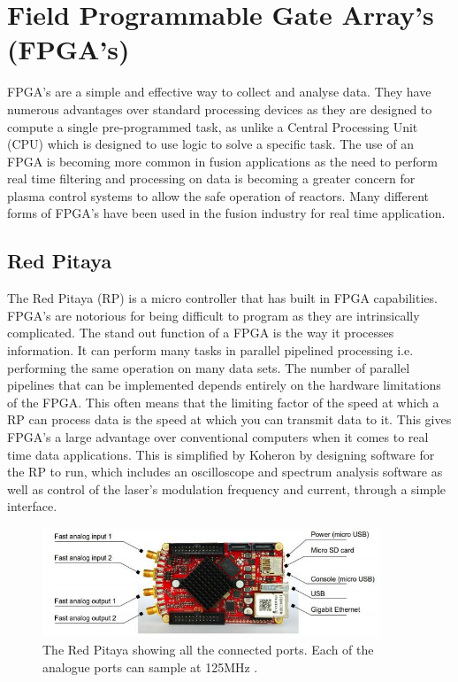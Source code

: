 \documentclass[12pt,a4paper,oneside]{report}
\begin{document}
	\section{Field Programmable Gate Array's (FPGA's)}
FPGA's are a simple and effective way to collect and analyse data. They have numerous advantages over standard processing devices as they are designed to compute a single pre-programmed task, as unlike a Central Processing Unit (CPU) which is designed to use logic to solve a specific task. The use of an FPGA is becoming more common in fusion applications as the need to perform real time filtering \cite{Naylor2010AnMAST} and processing on data is becoming a greater concern for plasma control systems to allow the safe operation of reactors. Many different forms of FPGA's have been used in the fusion industry for real time application.
	\subsection{Red Pitaya}
    
The Red Pitaya (RP) \cite{Leban2014RedManual} is a micro controller that has built in FPGA capabilities. FPGA's are notorious for being difficult to program as they are intrinsically complicated. The stand out function of a FPGA is the way it processes information. It can perform many tasks in parallel pipelined processing i.e. performing the same operation on many data sets. The number of parallel pipelines that can be implemented depends entirely on the hardware limitations of the FPGA. This often means that the limiting factor of the speed at which a RP can process data is the speed at which you can transmit data to it. This gives FPGA's a large advantage over conventional computers when it comes to real time data applications. This is simplified by Koheron by designing software for the RP to run, which includes an oscilloscope and spectrum analysis software as well as control of the laser's modulation frequency and current, through a simple interface.

\begin{figure}[H]
\includegraphics[width=0.9\textwidth, center,angle=0]{Images/RP.JPG}
\caption{The Red Pitaya showing all the connected ports. Each of the analogue ports can sample at 125MHz \cite[p.~7]{Leban2014RedManual}.}
\label{RP}
\end{figure}
\end{document}
